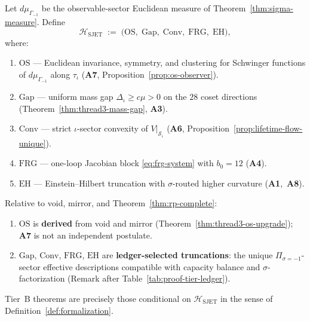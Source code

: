 \begin{definition}
\label{def:analytic-bundle}
Let $d\mu_{\Gamma_{-1}}$ be the observable-sector Euclidean measure of
Theorem~\ref{thm:sigma-measure}. Define
\begin{equation}\label{eq:analytic-bundle}
  \mathcal{H}_{\mathrm{SJET}}
  \;:=\;
  \bigl(
    \mathrm{OS},\;
    \mathrm{Gap},\;
    \mathrm{Conv},\;
    \mathrm{FRG},\;
    \mathrm{EH}
  \bigr),
\end{equation}
where:
\begin{enumerate}[label=(\roman*),leftmargin=*]
  \item $\mathrm{OS}$ --- Euclidean invariance, symmetry, and clustering for
    Schwinger functions of $d\mu_{\Gamma_{-1}}$ along $\tau_\iota$
    (\textbf{A7}, Proposition~\ref{prop:os-observer}).
  \item $\mathrm{Gap}$ --- uniform mass gap $\Delta_\iota\ge c\mu>0$ on the
    $28$ coset directions (Theorem~\ref{thm:thread3-mass-gap}, \textbf{A3}).
  \item $\mathrm{Conv}$ --- strict $\iota$-sector convexity of $V|_{\mathcal{S}_\iota}$
    (\textbf{A6}, Proposition~\ref{prop:lifetime-flow-unique}).
  \item $\mathrm{FRG}$ --- one-loop Jacobian block
    \eqref{eq:frg-system} with $b_0=12$ (\textbf{A4}).
  \item $\mathrm{EH}$ --- Einstein--Hilbert truncation with
    $\sigma$-routed higher curvature (\textbf{A1},~\textbf{A8}).
\end{enumerate}
\end{definition}

\begin{theorem}
\label{thm:formal-analytic-derived}
Relative to void, mirror, and Theorem~\ref{thm:rp-complete}:
\begin{enumerate}[label=(\roman*),leftmargin=*]
  \item $\mathrm{OS}$ is \textbf{derived} from void and mirror
    (Theorem~\ref{thm:thread3-os-upgrade}); \textbf{A7} is not an independent
    postulate.
  \item $\mathrm{Gap}$, $\mathrm{Conv}$, $\mathrm{FRG}$, $\mathrm{EH}$ are
    \textbf{ledger-selected truncations}: the unique $\Pi_{\sigma=-1}$-sector
    effective descriptions compatible with capacity balance and
    $\sigma$-factorization (Remark after Table~\ref{tab:proof-tier-ledger}).
\end{enumerate}
Tier~B theorems are precisely those conditional on
$\mathcal{H}_{\mathrm{SJET}}$ in the sense of
Definition~\ref{def:formalization}.
\end{theorem}

